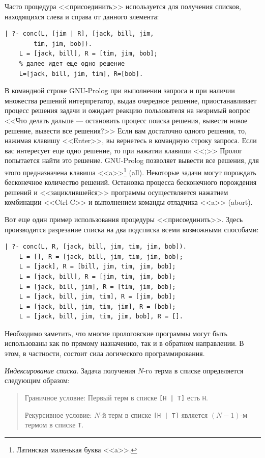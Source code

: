 \documentclass[12pt, openany, twoside]{book} %
\begin{document}
Часто процедура <<присоединить>> используется для получения списков, находящихся слева и справа от данного элемента:
{\tt\begin{verbatim}
| ?- conc(L, [jim | R], [jack, bill, jim,
        tim, jim, bob]).
    L = [jack, bill], R = [tim, jim, bob];
    % далее идет еще одно решение
    L=[jack, bill, jim, tim], R=[bob].
\end{verbatim}}
В командной строке GNU-Prolog при выполнении запроса и при наличии множества решений интерпретатор, выдав очередное решение, приостанавливает процесс решения задачи и ожидает реакцию пользователя на незримый вопрос <<Что делать дальше --- остановить процесс поиска решения, вывести новое решение, вывести все решения?>> Если вам достаточно одного решения, то, нажимая клавишу <<Enter>>, вы вернетесь в командную строку запроса. Если вас интересует еще одно решение, то при нажатии клавиши <<;>> Пролог попытается найти это решение. GNU-Prolog позволяет вывести все решения, для этого предназначена клавиша <<a>>\footnote{Латинская маленькая буква <<a>>.} (all). Некоторые задачи могут порождать бесконечное количество решений. Остановка процесса бесконечного порождения решений и <<зациклившейся>> программы осуществляется нажатием комбинации <<Ctrl-C>> и выполнением команды отладчика <<a>> (abort).

Вот еще один пример использования процедуры <<присоединить>>. Здесь производится разрезание списка на два подсписка всеми возможными способами:
{\tt\begin{verbatim}
| ?- conc(L, R, [jack, bill, jim, tim, jim, bob]).
    L = [], R = [jack, bill, jim, tim, jim, bob];
    L = [jack], R = [bill, jim, tim, jim, bob];
    L = [jack, bill], R = [jim, tim, jim, bob];
    L = [jack, bill, jim], R = [tim, jim, bob];
    L = [jack, bill, jim, tim], R = [jim, bob];
    L = [jack, bill, jim, tim, jim], R = [bob];
    L = [jack, bill, jim, tim, jim, bob], R = [].
\end{verbatim}}
Необходимо заметить, что многие прологовские программы могут быть использованы как по прямому назначению, так и в обратном направлении. В этом, в частности, состоит сила логического программирования.

\emph{Индексирование списка}. Задача получения $N$-гo терма в списке определяется следующим образом:

\begin{quote}
\noindent Граничное условие: Первый терм в списке {\tt [Н | Т]} есть {\tt Н}.

\noindent Рекурсивное условие: $N$-й терм в списке {\tt [Н | Т]} является $(N-1)$-м термом в списке {\tt Т}.
\end{quote}
\end{document}
